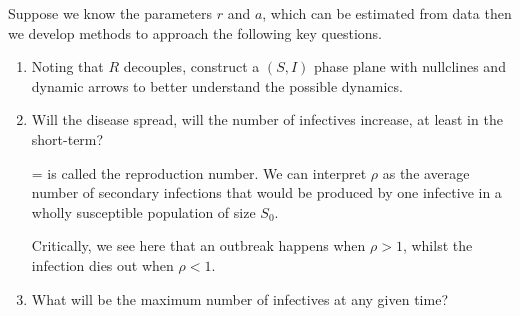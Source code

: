 \begin{example}[frametitle=SIR questions \label{SIR}]
Suppose we know the parameters $r$ and $a$, which can be estimated from data then we develop methods to approach the following key questions.
\begin{enumerate}
\item Noting that $R$ decouples, construct a $(S,I)$ phase plane with nullclines and dynamic arrows to better understand the possible dynamics.


\item Will the disease spread, \ie will the number of infectives increase, at least in the short-term?

\begin{defin}
\bb
\rho=
\ee
is called the reproduction number. We can interpret $\rho$ as the average number of secondary infections that would be produced by one infective in a wholly susceptible population of size
$S_0$.
\end{defin}
Critically, we see here that an outbreak happens when $\rho>1$, whilst the infection dies out when $\rho<1$.

\item What will be the maximum number of infectives at any given time?



\end{enumerate}
\end{example}
